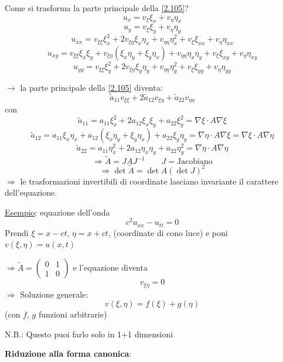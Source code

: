 \documentclass[a4paper,11pt]{report}
\begin{document}
Come si trasforma la parte principale della \eqref{2.105}?
\[
u_x=v_\xi \xi_x + v_\eta \eta_x
\]
\[
u_y=v_\xi \xi_y + v_\eta \eta_y
\]
\[
u_{xx}=v_{\xi \xi}\xi_x^2 + 2v_{\xi\eta}\xi_x\eta_x + v_{\eta\eta}\eta_x^2 + v_\xi \xi_{xx} +v_\eta \eta_{xx}
\]
\[
u_{xy}= v_{\xi \xi}\xi_x\xi_y + v_{\xi\eta}(\xi_x\eta_y + \xi_y\eta_x) + v_{\eta\eta} \eta_x\eta_y + v_\xi \xi_{xy} + v_\eta \eta_{xy}
\]
\[
u_{yy}= v_{\xi\xi }\xi_y^2 + 2v_{\xi\eta}\xi_y\eta_y + v_{\eta\eta}\eta_y^2 + v_\xi \xi_{yy} + v_\eta \eta_{yy}
\]

$\rightarrow$ la parte principale della \eqref{2.105} diventa: 
\begin{equation}
\tilde{a}_{11} v_{\xi\xi} + 2 \tilde{a}_{12}v_{\xi\eta} + \tilde{a}_{22}v_{\eta\eta}
\label{2.117}
\end{equation}
con 
\[
\tilde{a}_{11}= a_{11} \xi_x^2 + 2a_{12}\xi_x\xi_y + a_{22} \xi_y^2 = \nabla\xi \cdot A \nabla \xi
\]
\[
\tilde{a}_{12}= a_{11} \xi_x\eta_x + a_{12}(\xi_x\eta_y+\xi_y\eta_x) + a_{22} \xi_y\eta_y = \nabla \eta \cdot A\nabla \xi = \nabla \xi \cdot A \nabla \eta
\]
\[
\tilde{a}_{22}= a_{11} \eta_x^2 + 2a_{12}\eta_x\eta_y + a_{22} \eta_y^2 = \nabla \eta \cdot A \nabla \eta
\]
\[
\Rightarrow \tilde{A} = J A J^{-1} \qquad J=\text{Jacobiano} 
\]
\[
\Rightarrow \det \tilde{A} = \det A (\det J)^2
\]
$\Rightarrow$ le trasformazioni invertibili di coordinate lasciano invariante il carattere dell'equazione.

\medskip

\underline{Esempio}: equazione dell'onda
\[
c^2u_{xx} - u_{tt}=0
\]
Prendi $\xi=x-ct$, $\eta = x+ct$, (coordinate di cono luce) e poni $v(\xi,\eta) = u(x,t)$ 

$\Rightarrow \tilde{A}=\left(\begin{matrix} 0 & 1\\ 1 & 0 \end{matrix}\right)$ e l'equazione diventa
\[
v_{\xi\eta}=0
\]
$\Rightarrow$ Soluzione generale:
\[
v(\xi,\eta)=f(\xi) + g(\eta)
\]
(con $f$, $g$ funzioni arbitrarie)

N.B.: Questo puoi farlo solo in 1+1 dimensioni

\medskip

\textbf{Riduzione alla forma canonica}:
\end{document}
